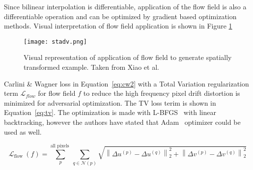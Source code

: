 Since bilinear interpolation is differentiable, application of the flow field is also a differentiable operation and can be optimized by gradient based optimization methods. Visual interpretation of flow field application is shown in Figure \ref{fig:stadv}

\begin{figure}[h]
    \texttt{[image: stadv.png]}
    \caption{Visual representation of application of flow field to generate spatially transformed example. Taken from Xiao et al. \cite{xiao2018spatially}}\label{fig:stadv}

\end{figure}

Carlini \& Wagner loss in Equation~\ref{eq:cw2} with a Total Variation regularization term \(\mathcal{L}_{flow}\) for flow field \(f\) to reduce the high frequency pixel drift distortion is minimized for adversarial optimization. The TV loss terim is shown in Equation~\ref{eq:tv}. The optimization is made with L-BFGS~\cite{liu1989limited} with linear backtracking, however the authors have stated that Adam~\cite{kingma2015adam} optimizer could be used as well.


\begin{equation}
    \label{eq:tv}
    \mathcal{L}_{\text {flow }}(f)=\sum_{p}^{\text {all pixels }} \sum_{q \in \mathcal{N}(p)} \sqrt{\left\|\Delta u^{(p)}-\Delta u^{(q)}\right\|_{2}^{2}+\left\|\Delta v^{(p)}-\Delta v^{(q)}\right\|_{2}^{2}}
\end{equation}





